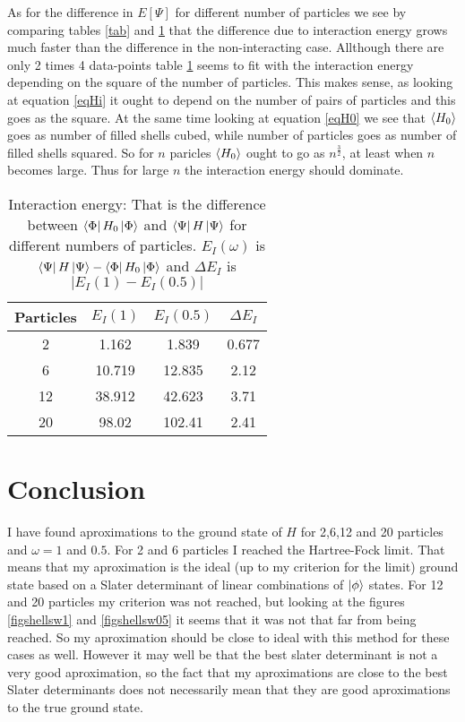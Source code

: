 \documentclass[a4paper,english,12pt]{article}
\newcommand{\f}{\frac}
\begin{document}
As for the difference in $E[\Psi]$ for different number of particles we see by comparing tables \ref{tab} and \ref{tabI}
that the difference due to interaction energy grows much faster than the difference in the non-interacting case.
Allthough there are only 2 times 4 data-points table \ref{tabI} seems to fit with the interaction energy depending on
the square of the number of particles. This makes sense, as looking at equation \ref{eqHi} it ought to depend on the number of pairs of particles
and this goes as the square. At the same time looking at equation \ref{eqH0} we see that $\braket{H_0}$ goes as number of filled shells cubed,
while number of particles goes as number of filled shells squared. So for $n$ paricles $\braket{H_0}$ ought to go as $n^{\f{3}{2}}$, at least when $n$
becomes large. Thus for large $n$ the interaction energy should dominate.


\begin{table}
  \caption{Interaction energy: That is the difference between $\Bra{\Phi}H_0\Ket{\Phi}$ and $\Bra{\Psi}H\Ket{\Psi}$ for
    different numbers of particles. $E_I(\omega)$ is $\Bra{\Psi}H\Ket{\Psi}-\Bra{\Phi}H_0\Ket{\Phi}$ and
    \(\Delta E_I\) is \(|E_I(1)-E_I(0.5)|\)}\label{tabI}
  \begin{center}
    \begin{tabular}{*{4}{c}}
      Particles &  $E_I(1)$ & $E_I(0.5)$ & $\Delta E_I$ \\
      \hline
      2&1.162 & 1.839 & 0.677\\
      6&10.719&12.835 &2.12\\
      12&38.912 & 42.623 & 3.71\\
      20&98.02 & 102.41 & 2.41\\
    \end{tabular}
  \end{center}
\end{table}




\section{Conclusion}
I have found aproximations to the ground state of $H$ for 2,6,12 and 20 particles and $\omega = 1$ and $0.5$. For 2 and 6 particles I reached the
Hartree-Fock limit. That means that my aproximation is the ideal (up to my criterion for the limit) ground state based on a Slater determinant
of linear combinations of $\ket{\phi}$ states. For 12 and 20 particles my criterion was not reached, but looking at the figures \ref{figshellsw1}
and \ref{figshellsw05} it seems that it was not that far from being reached. So my aproximation should be close to ideal with this method for these
cases as well. However it may well be that the best slater determinant is not a very good aproximation, so the fact that my aproximations are close
to the best Slater determinants does not necessarily mean that they are good aproximations to the true ground state.
\end{document}
